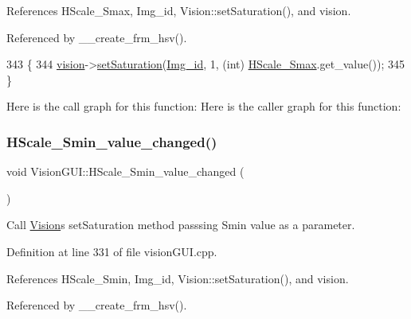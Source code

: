 References H\+Scale\+\_\+\+Smax, Img\+\_\+id, Vision\+::set\+Saturation(), and vision.



Referenced by \+\_\+\+\_\+create\+\_\+frm\+\_\+hsv().


\begin{DoxyCode}
343                                           \{
344     \hyperlink{class_vision_g_u_i_a36aba058af844ec6cbe0c945c616cd5f}{vision}->\hyperlink{class_vision_a4a07d52d53fa8626e6dd7b36fed89841}{setSaturation}(\hyperlink{class_vision_g_u_i_a4a46f114bc58e0f1d56b655f4bc8f9d8}{Img\_id}, 1, (\textcolor{keywordtype}{int}) \hyperlink{class_vision_g_u_i_a147e8499bd7412fdb732103c0754f013}{HScale\_Smax}.get\_value());
345 \}
\end{DoxyCode}
Here is the call graph for this function\+:
Here is the caller graph for this function\+:
\mbox{\label{class_vision_g_u_i_a4e521dabf97b0820f40272290b471ed2}} 
\subsubsection{\texorpdfstring{H\+Scale\+\_\+\+Smin\+\_\+value\+\_\+changed()}{HScale\_Smin\_value\_changed()}}
{\footnotesize\ttfamily void Vision\+G\+U\+I\+::\+H\+Scale\+\_\+\+Smin\+\_\+value\+\_\+changed (\begin{DoxyParamCaption}{ }\end{DoxyParamCaption})\hspace{0.3cm}{\ttfamily [private]}}



Call \hyperlink{class_vision}{Vision}\textquotesingle{}s set\+Saturation method passsing Smin value as a parameter. 



Definition at line 331 of file vision\+G\+U\+I.\+cpp.



References H\+Scale\+\_\+\+Smin, Img\+\_\+id, Vision\+::set\+Saturation(), and vision.



Referenced by \+\_\+\+\_\+create\+\_\+frm\+\_\+hsv().


